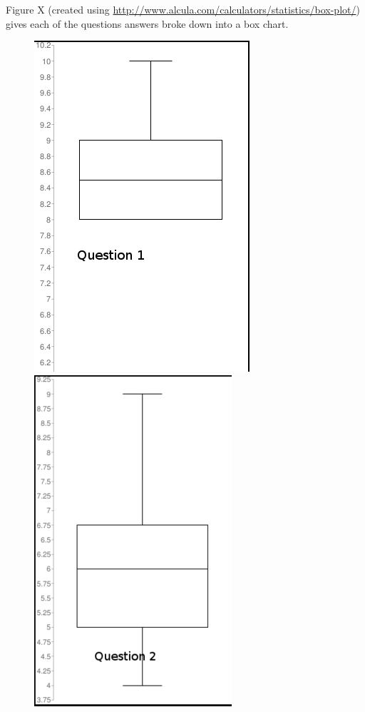 Figure X (created using \url{http://www.alcula.com/calculators/statistics/box-plot/}) gives each of the questions answers broke down into a box chart.
\begin{center}
\begin{figure}[H]
\includegraphics[scale=0.45]{images/q1}
\includegraphics[scale=0.45]{images/q2}

\end{figure}
\end{center}
